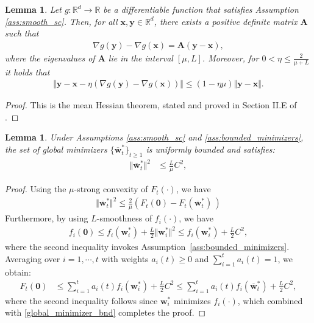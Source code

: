 \documentclass[conference]{IEEEtran}
\newtheorem{lemma}[theorem]{Lemma}
\begin{document}
\appendix
\begin{lemma}
\label{lemma:MHT}
Let $g:\mathbb{R}^d\to\mathbb{R}$ be a differentiable function that satisfies Assumption \ref{ass:smooth_sc}. Then,  for all $\mathbf{x},\mathbf{y} \in \mathbb{R}^d$, there exists a positive definite matrix $\mathbf{A}$ such that 
\begin{align*}
\nabla g(\mathbf{y})-\nabla g(\mathbf{x})=\mathbf{A}(\mathbf{y}-\mathbf{x}),
\end{align*} 
where the eigenvalues of $\mathbf{A}$ lie in the interval $ [\mu, L] $. Moreover, for $ 0 < \eta \leq \frac{2}{\mu + L}$ it holds that 
\begin{align*}
\Vert \mathbf{y} - \mathbf{x} - \eta \left( \nabla g(\mathbf{y}) - \nabla g(\mathbf{x})\right)\Vert \leq (1-\eta\mu)\Vert  \mathbf{y} - \mathbf{x}\Vert.
\end{align*}
\end{lemma}
\begin{proof}
This is the mean Hessian theorem, stated and proved in Section II.E of \cite{MHT}.
\end{proof}
\begin{lemma}
\label{lemma:glob_minimizer_bnd}
Under Assumptions \ref{ass:smooth_sc} and \ref{ass:bounded_minimizers}, the set of global minimizers $\{\overline{\mathbf{w}}^*_{t}\}_{t\geq1}$ is uniformly bounded and satisfies:
\begin{align}
    \Vert \overline{\mathbf{w}}^*_{t} \Vert^2 
    &\leq \frac{L}{\mu} C^2,
\end{align}
\end{lemma}
\begin{proof}
Using the $\mu$-strong convexity of $F_t(\cdot)$, we have
\begin{align}
    \Vert \overline{\mathbf{w}}^*_{t} \Vert^2 \leq \frac{2}{\mu}\left(F_t(\mathbf{0}) - F_t(\overline{\mathbf{w}}^*_{t})\, \right)
    \label{global_minimizer_bnd}
\end{align}
Furthermore, by using $L$-smoothness of $f_i(\cdot)$, we have
\begin{align*}
    f_i(\mathbf{0}) \leq f_i(\mathbf{w}_i^*) + \frac{L}{2} \Vert \mathbf{w}_i^*\Vert^2 \leq f_i(\mathbf{w}_i^*) + \frac{L}{2} C^2,
\end{align*}
where the second inequality invokes Assumption~\ref{ass:bounded_minimizers}. Averaging over $i=1,\cdots,t$ with weights $a_i(t)\geq0$ and $\sum_{i=1}^ta_i(t) =1$, we obtain:
\begin{align}
    F_t(\mathbf{0})&\leq\sum_{i=1}^t a_i(t)f_i(\mathbf{w}_i^*) + \frac{L}{2} C^2 \nonumber\leq \sum_{i=1}^t a_i(t)f_i(\overline{\mathbf{w}}^*_{t}) + \frac{L}{2} C^2, \nonumber
\end{align}
where the second inequality follows since $\mathbf{w}_i^*$ minimizes $f_i(\cdot)$, which combined with \eqref{global_minimizer_bnd} completes the proof. 
\end{proof}
\end{document}
